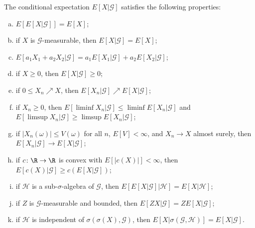 \documentclass[10pt]{mypackage}
\begin{document}
\begin{theorem}
  The conditional expectation $E\left[ X|\mathcal{G} \right]$ satisfies the following properties:
  \begin{enumerate}[(a)]
    \item $E\left[ E\left[ X|\mathcal{G} \right] \right] = E\left[ X \right]$;
    \item if $X$ is $\mathcal{G}$-measurable, then $E\left[ X|\mathcal{G} \right] = E\left[ X \right]$;
    \item $E\left[ a_1X_1 + a_2X_2|\mathcal{G} \right] = a_1E\left[ X_1|\mathcal{G} \right] + a_2E\left[ X_2|\mathcal{G} \right]$;
    \item if $X\geq 0$, then $E\left[ X|\mathcal{G} \right]\geq 0$;
    \item if $0\leq X_n\nearrow X$, then $E\left[ X_n|\mathcal{G} \right]\nearrow E\left[ X|\mathcal{G} \right]$;
    \item if $X_n\geq 0$, then $E\left[ \liminf X_n|\mathcal{G} \right]\leq \liminf E\left[ X_n|\mathcal{G} \right]$ and $E\left[ \limsup X_n|\mathcal{G} \right]\geq \limsup E\left[ X_n|\mathcal{G} \right]$;
    \item if $\left\vert X_n(\omega) \right\vert\leq V(\omega)$ for all $n$, $E\left[ V \right] < \infty$, and $X_n\to X$ almost surely, then $E\left[ X_n|\mathcal{G} \right]\to E\left[ X|\mathcal{G} \right]$;
    \item if $c\colon \R\to\R$ is convex with $E\left[ \left\vert c\left( X \right) \right\vert \right] < \infty$, then $E\left[ c(X)|\mathcal{G} \right]\geq c\left( E\left[ X|\mathcal{G} \right] \right)$;
    \item if $\mathcal{H}$ is a sub-$\sigma$-algebra of $\mathcal{G}$, then $E\left[ E\left[ X|\mathcal{G} \right]|\mathcal{H} \right] = E\left[ X|\mathcal{H} \right]$;
    \item if $Z$ is $\mathcal{G}$-measurable and bounded, then $E\left[ ZX|\mathcal{G} \right] = ZE\left[ X|\mathcal{G} \right]$;
    \item if $\mathcal{H}$ is independent of $\sigma\left( \sigma\left( X \right),\mathcal{G} \right)$, then $E\left[ X|\sigma\left( \mathcal{G},\mathcal{H} \right) \right] = E\left[ X|\mathcal{G} \right]$.
  \end{enumerate}
\end{theorem}
\end{document}
